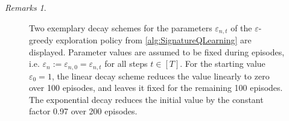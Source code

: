 \documentclass[
    a4paper,
    11pt,
    bibliography=totoc,
    listof=totoc,      
    headinclude=true,
    cleardoublepage=empty,
]{scrbook}
\theoremstyle{plain}
\theoremstyle{definition}
\theoremstyle{remark}
\newtheorem{remarks}[theorem]{Remarks}
\begin{document}
\begin{remarks}
\begin{enumerate}
        \begin{figure}
            \centering
            \caption[Illustration of exploration parameter decay schemes]{Two
                exemplary decay schemes for the parameters 
                $\varepsilon_{n,t}$ of the $\varepsilon$-greedy exploration
                policy from \cref{alg:SignatureQLearning} are displayed.
                Parameter values are assumed to be fixed during episodes, i.e.
                $\varepsilon_n := \varepsilon_{n,0} = \varepsilon_{n,t}$ for
                all steps $t\in[T]$. For the starting value $\varepsilon_{0} =
                1$, the linear decay scheme reduces the value linearly to zero
                over 100 episodes, and leaves it fixed for the remaining 100
                episodes. The exponential decay reduces the initial value by
                the constant factor 0.97 over 200 episodes.}
            \label{fig:EpsilonDecaySchemes}
        \end{figure}        
    

\end{enumerate}
\end{remarks}
\end{document}
